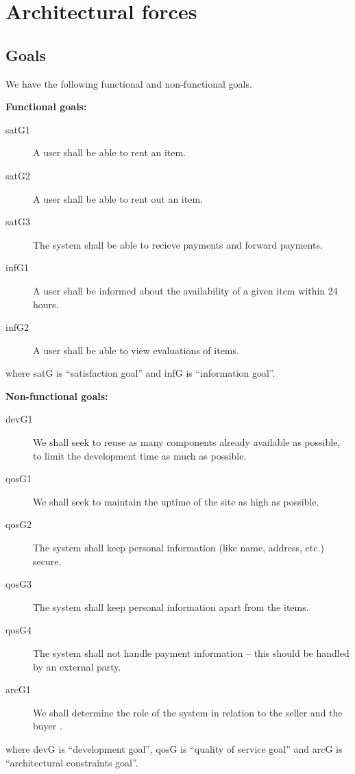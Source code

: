 \documentclass[a4paper,11pt]{report}
\newcommand{\seller}{ seller }
\newcommand{\buyer}{ buyer }
\begin{document}
\chapter{Architectural forces}
\label{cha:architectural-forces}
\thispagestyle{fancy}

\section{Goals}
\label{sec:goals}
We have the following functional and non-functional goals.

\textbf{Functional goals:}
\begin{description}
  \item[satG1] A user shall be able to rent an item.
  \item[satG2] A user shall be able to rent out an item.
  \item[satG3] The system shall be able to recieve payments and forward payments.
  \item[infG1] A user shall be informed about the availability of a given item within 24 hours.
  \item[infG2] A user shall be able to view evaluations of items.
\end{description}
where satG is ``satisfaction goal'' and infG is ``information goal''.

\textbf{Non-functional goals:}
\begin{description}
  \item[devG1] We shall seek to reuse as many components already available as possible, to limit the development time as much as possible.
  \item[qosG1] We shall seek to maintain the uptime of the site as high as possible.
  \item[qosG2] The system shall keep personal information (like name, address, etc.) secure.
  \item[qosG3] The system shall keep personal information apart from the items. %
  \item[qosG4] The system shall not handle payment information --  this should be handled by an external party.
  \item[arcG1] We shall determine the role of the system in relation to the \seller and the \buyer.
\end{description}
where devG is ``development goal'', qosG is ``quality of service goal'' and arcG is ``architectural constraints goal''.
\end{document}
